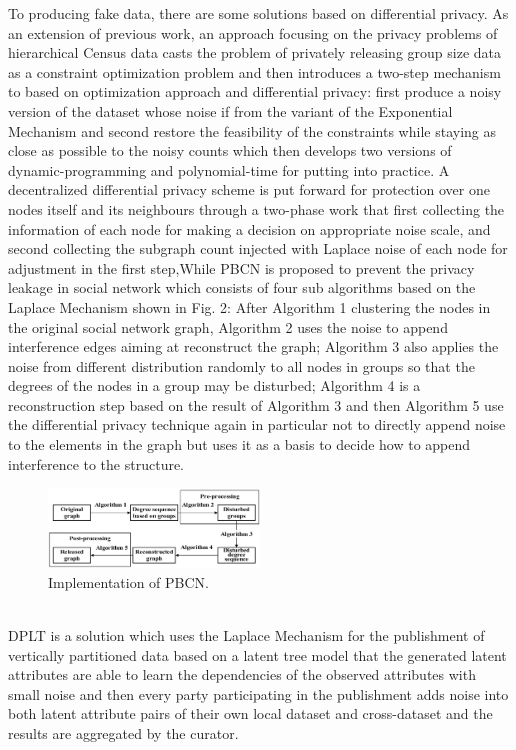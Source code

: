 \documentclass[conference]{IEEEtran}
\begin{document}
To producing fake data, there are some solutions based on differential privacy. As an extension of previous work, an approach\cite{b7} focusing on the privacy problems of hierarchical Census data casts the problem of privately releasing group size data as a constraint optimization problem and then introduces a two-step mechanism to based on optimization approach and differential privacy: first produce a noisy version of the dataset whose noise if from the variant of the Exponential Mechanism and second restore the feasibility of the constraints while staying as close as possible to the noisy counts which then develops two versions of dynamic-programming and polynomial-time for putting into practice. A decentralized differential privacy scheme\cite{b8} is put forward for protection over one nodes itself and its neighbours through a two-phase work that first collecting the information of each node for making a decision on appropriate noise scale, and second collecting the subgraph count injected with Laplace noise of each node for adjustment in the first step,While PBCN\cite{b9} is proposed to prevent the privacy leakage in social network which consists of four sub algorithms based on the Laplace Mechanism shown in Fig. 2: After Algorithm 1 clustering the nodes in the original social network graph, Algorithm 2 uses the noise to append interference edges aiming at reconstruct the graph; Algorithm 3 also applies the noise from different distribution randomly to all nodes in groups so that the degrees of the nodes in a group may be disturbed; Algorithm 4 is a reconstruction step based on the result of Algorithm 3 and then Algorithm 5 use the differential privacy technique again in particular not to directly append noise to the elements in the graph but uses it as a basis to decide how to append interference to the structure. 
\begin{figure}[htbp]
    \centerline{\includegraphics[width=0.5\textwidth,height=0.2\textwidth]{PBCN.png}}
    \caption{Implementation of PBCN.}
    \label{fig2}
\end{figure}\\
DPLT\cite{b10} is a solution which uses the Laplace Mechanism for the publishment of vertically partitioned data based on a latent tree model that the generated latent attributes are able to learn the dependencies of the observed attributes with small noise and then every party participating in the publishment adds noise into both latent attribute pairs of their own local dataset and cross-dataset and the results are aggregated by the curator.
\end{document}

